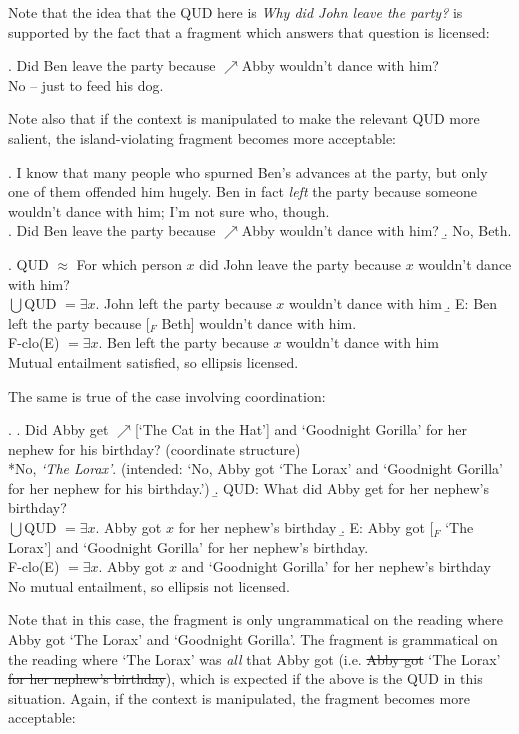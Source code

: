 \documentclass[11pt,letterpaper]{article}
\newcommand{\el}[1]{\sout{#1}}
\begin{document}
Note that the idea that the QUD here is {\it Why did John leave the party?} is supported by the fact that a fragment which answers that question is licensed:

\ex. 	Did Ben leave the party because $\nearrow$Abby wouldn't dance with him?\\
	No -- just to feed his dog.
	
Note also that if the context is manipulated to make the relevant QUD more salient, the island-violating fragment becomes more acceptable:

\ex. 	I know that many people who spurned Ben's advances at the party, but only one of them offended him hugely. Ben in fact \emph{left} the party because someone wouldn't dance with him; I'm not sure who, though.\\
	\a. Did Ben leave the party because $\nearrow$Abby wouldn't dance with him?
	\b. No, Beth.

\ex. 	QUD $\approx$ For which person $x$ did John leave the party because $x$ wouldn't dance with him?\\
		$\bigcup$QUD $ = \exists x.$ John left the party because $x$ wouldn't dance with him
	\b. E: Ben left the party because [$_F$ Beth] wouldn't dance with him.\\
		F-clo(E) $= \exists x. $ Ben left the party because $x$ wouldn't dance with him\\
	Mutual entailment satisfied, so ellipsis licensed.	

The same is true of the case involving coordination:

\ex. \a. Did Abby get $\nearrow$[`The Cat in the Hat'] and `Goodnight Gorilla' for her nephew for his birthday? \hfill (coordinate structure)\\
	{}*No, \emph{`The Lorax'}. (intended: `No, Abby got `The Lorax' and `Goodnight Gorilla' for her nephew for his birthday.')
	\b. QUD: What did Abby get for her nephew's birthday?\\
		$\bigcup$QUD $= \exists x. $ Abby got $x$ for her nephew's birthday
	\b. E: Abby got [$_F$ `The Lorax'] and `Goodnight Gorilla' for her nephew's birthday.\\
		F-clo(E) $ = \exists x. $ Abby got $x$ and `Goodnight Gorilla' for her nephew's birthday\\
	No mutual entailment, so ellipsis not licensed.
	
Note that in this case, the fragment is only ungrammatical on the reading where Abby got `The Lorax' and `Goodnight Gorilla'. The fragment is grammatical on the reading where `The Lorax' was \emph{all} that Abby got (i.e. \el{Abby got} `The Lorax' \el{for her nephew's birthday}), which is expected if the above is the QUD in this situation. Again, if the context is manipulated, the fragment becomes more acceptable:
\end{document}

